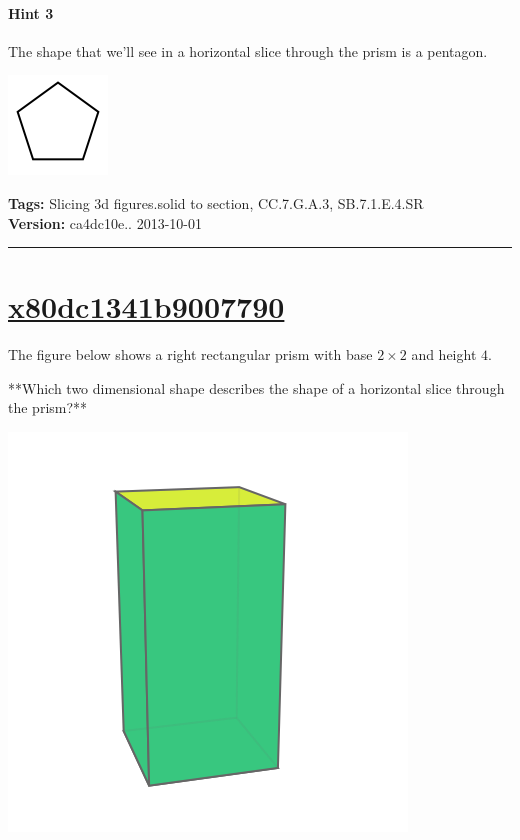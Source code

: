 \documentclass[twocolumn,10pt]{article}
\def\shrinkfactor{0.55}
\begin{document}
\paragraph{Hint 3}The shape that we'll see in a horizontal slice through the prism is a pentagon.  

\includegraphics[scale=\shrinkfactor]{figures/498a6b09730fdba2360826c138eeee142e8cccc1.png}



\medskip
\noindent
\textbf{Tags:} {\footnotesize Slicing 3d figures.solid to section, CC.7.G.A.3, SB.7.1.E.4.SR}\\
\textbf{Version:} ca4dc10e.. 2013-10-01
\smallskip\hrule





\section{\href{https://www.khanacademy.org/devadmin/content/items/x80dc1341b9007790}{x80dc1341b9007790}}

\noindent
The figure below shows a right rectangular prism with base $2 \times 2$ and height $4$. 

**Which two dimensional shape describes the shape of a horizontal slice through the prism?**  


\includegraphics[scale=\shrinkfactor]{figures/5fc465f62d5e1338260e3fddfd32bff967dffbdf.png}
\end{document}
